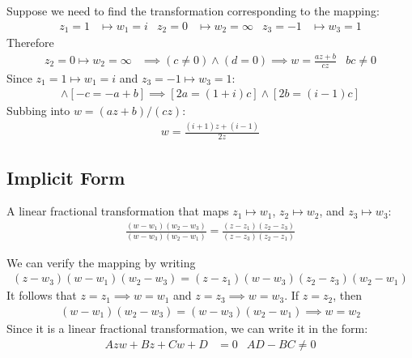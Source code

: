 \documentclass[12pt, english]{book}
\begin{document}
	\begin{example}
		Suppose we need to find the transformation corresponding to the mapping:
		\begin{align*}
			z_1 = 1 &\mapsto w_1 = i &
			z_2 = 0 &\mapsto w_2 = \infty &
			z_3 = -1 &\mapsto w_3 = 1
		\end{align*}
		Therefore
		\begin{align*}
			z_2 = 0 \mapsto w_2 = \infty 
			&\implies (c \neq 0) \land (d=0)
			\implies w = \frac{az + b}{cz}
				& bc \neq 0
		\end{align*}
		Since \(z_1 = 1 \mapsto w_1 = i\) and \(z_3 = -1 \mapsto w_3 = 1\):
		\begin{align*}
			[ic = a + b] \land [-c = -a + b] 
			\implies [2a = (1 + i)c] \land [2b = (i - 1)c]
		\end{align*}
		Subbing into \(w = (az + b)/(cz)\):
		\begin{align*}
			w = \frac{(i + 1)z + (i - 1)}{2z}
		\end{align*}
	\end{example}

	\subsection{Implicit Form} \label{Implicit Form Subsection - Complex}
	
	\begin{definition}
		\label{Linear Fractional Transformaiton Implicit Form Definition - Complex}
		A linear fractional transformation that maps \(z_1 \mapsto w_1\), \(z_2 \mapsto w_2\), and \(z_3 \mapsto w_3\):
		\begin{align*}
			\frac{(w - w_1)(w_2 - w_3)}{(w - w_3)(w_2 - w_1)} 
			= \frac{(z - z_1)(z_2 - z_3)}{(z - z_3)(z_2 - z_1)}
		\end{align*}
	\end{definition}

	We can verify the mapping by writing
	\begin{align*}
		(z - w_3)(w - w_1)(w_2 - w_3) = (z-z_1)(w-w_3)(z_2 - z_3)(w_2 - w_1)
	\end{align*}
	It follows that \(z = z_1 \implies w = w_1\) and \(z = z_3 \implies w = w_3\). If \(z = z_2\), then
	\begin{align*}
		(w - w_1)(w_2 - w_3) = (w - w_3)(w_2 - w_1) \implies w = w_2
	\end{align*}
	Since it is a linear fractional transformation, we can write it in the form:
	\begin{align*}
		Azw + Bz + Cw + D &= 0 & AD - BC \neq 0 
	\end{align*}
	
\end{document}
